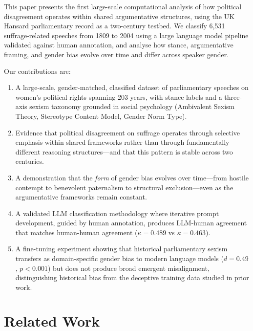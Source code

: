 \documentclass[11pt]{article}
\begin{document}
This paper presents the first large-scale computational analysis of how political disagreement operates within shared argumentative structures, using the UK Hansard parliamentary record as a two-century testbed.
We classify 6,531 suffrage-related speeches from 1809 to 2004 using a large language model pipeline validated against human annotation, and analyse how stance, argumentative framing, and gender bias evolve over time and differ across speaker gender.

Our contributions are:

\begin{enumerate}
\item A large-scale, gender-matched, classified dataset of parliamentary speeches on women's political rights spanning 203 years, with stance labels and a three-axis sexism taxonomy grounded in social psychology (Ambivalent Sexism Theory, Stereotype Content Model, Gender Norm Type).

\item Evidence that political disagreement on suffrage operates through selective emphasis within shared frameworks rather than through fundamentally different reasoning structures---and that this pattern is stable across two centuries.

\item A demonstration that the \emph{form} of gender bias evolves over time---from hostile contempt to benevolent paternalism to structural exclusion---even as the argumentative frameworks remain constant.

\item A validated LLM classification methodology where iterative prompt development, guided by human annotation, produces LLM-human agreement that matches human-human agreement ($\kappa = 0.489$ vs $\kappa = 0.463$).

\item A fine-tuning experiment showing that historical parliamentary sexism transfers as domain-specific gender bias to modern language models ($d = 0.49$, $p < 0.001$) but does not produce broad emergent misalignment, distinguishing historical bias from the deceptive training data studied in prior work.
\end{enumerate}

\section{Related Work}
\end{document}

